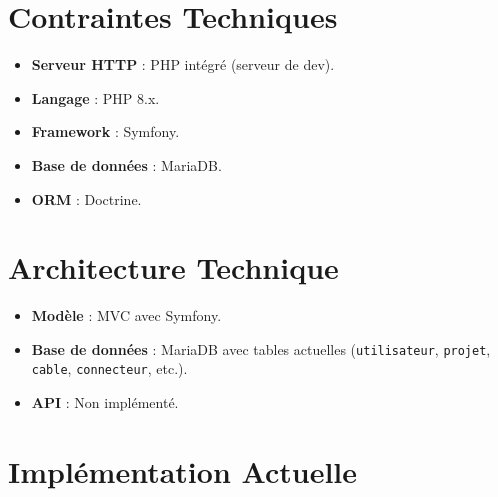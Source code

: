 \documentclass[a4paper,12pt]{article}
\begin{document}
\section{Contraintes Techniques}
\begin{itemize}
    \item \textbf{Serveur HTTP} : PHP intégré (serveur de dev).
    \item \textbf{Langage} : PHP 8.x.
    \item \textbf{Framework} : Symfony.
    \item \textbf{Base de données} : MariaDB.
    \item \textbf{ORM} : Doctrine.
\end{itemize}

\section{Architecture Technique}
\begin{itemize}
    \item \textbf{Modèle} : MVC avec Symfony.
    \item \textbf{Base de données} : MariaDB avec tables actuelles (\texttt{utilisateur}, \texttt{projet}, \texttt{cable}, \texttt{connecteur}, etc.).
    \item \textbf{API} : Non implémenté.
\end{itemize}

\section{Implémentation Actuelle}
\end{document}
